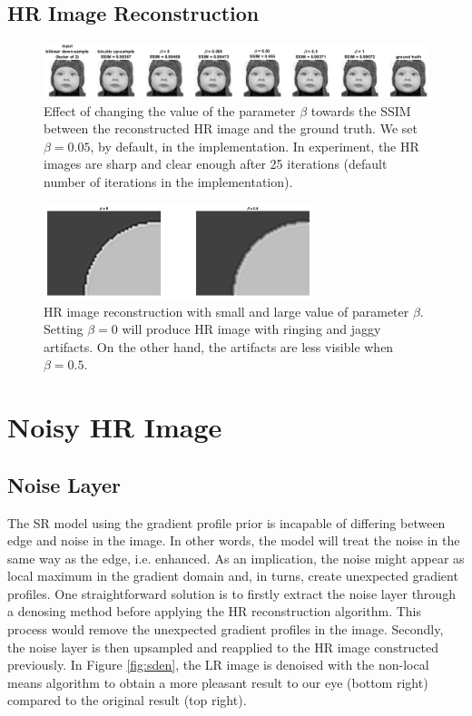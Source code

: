 \documentclass[a4paper,11pt]{article}
\begin{document}
\subsection{HR Image Reconstruction}

\begin{figure}[H]
	\centering
	\includegraphics[width=1\textwidth]{beta.png}
	\caption{Effect of changing the value of the parameter $\beta$ towards the SSIM between the reconstructed HR image and the ground truth. We set $\beta = 0.05$, by default, in the implementation. In experiment, the HR images are sharp and clear enough after 25 iterations (default number of iterations in the implementation).}
	\label{fig:beta}
\end{figure}

\begin{figure}[H]
	\centering
	\includegraphics[width=0.7\textwidth]{beta 0 05.png}
	\caption{HR image reconstruction with small and large value of parameter $\beta$. Setting $\beta = 0$ will produce HR image with ringing and jaggy artifacts. On the other hand, the artifacts are less visible when $\beta = 0.5$.}
	\label{fig:beta2}
\end{figure}


\section{Noisy HR Image}

\subsection{Noise Layer}
The SR model using the gradient profile prior is incapable of differing between edge and noise in the image. In other words, the model will treat the noise in the same way as the edge, i.e. enhanced. As an implication, the noise might appear as local maximum in the gradient domain and, in turns, create unexpected gradient profiles. One straightforward solution is to firstly extract the noise layer through a denosing method before applying the HR reconstruction algorithm. This process would remove the unexpected gradient profiles in the image. Secondly, the noise layer is then upsampled and reapplied to the HR image constructed previously. In Figure \ref{fig:sden}, the LR image is denoised with the non-local means algorithm\cite{nlm05} to obtain a more pleasant result to our eye (bottom right) compared to the original result (top right).
\end{document}
